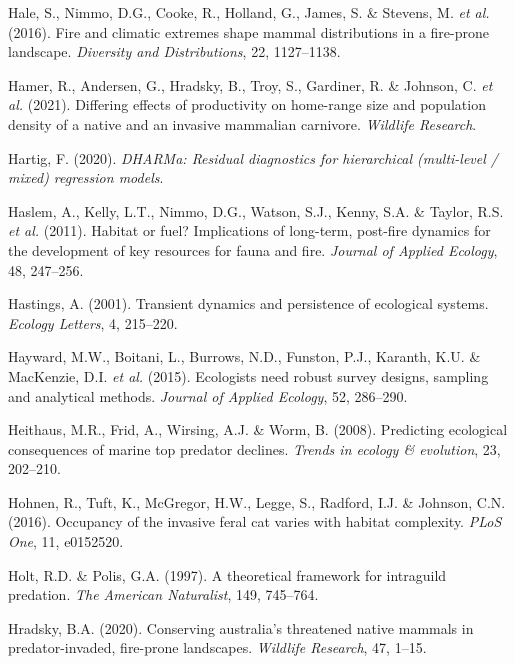 \documentclass[11pt,a4paper,titlepage,twoside,openright]{style/unimelbthesis}
\begin{document}
\begin{mainmatter}
\leavevmode\hypertarget{ref-hale2016fire}{}%
Hale, S., Nimmo, D.G., Cooke, R., Holland, G., James, S. \& Stevens, M. \emph{et al.} (2016). Fire and climatic extremes shape mammal distributions in a fire-prone landscape. \emph{Diversity and Distributions}, 22, 1127--1138.

\leavevmode\hypertarget{ref-hamerdiffering}{}%
Hamer, R., Andersen, G., Hradsky, B., Troy, S., Gardiner, R. \& Johnson, C. \emph{et al.} (2021). Differing effects of productivity on home-range size and population density of a native and an invasive mammalian carnivore. \emph{Wildlife Research}.

\leavevmode\hypertarget{ref-DHARMa}{}%
Hartig, F. (2020). \emph{DHARMa: Residual diagnostics for hierarchical (multi-level / mixed) regression models}.

\leavevmode\hypertarget{ref-haslem2011habitat}{}%
Haslem, A., Kelly, L.T., Nimmo, D.G., Watson, S.J., Kenny, S.A. \& Taylor, R.S. \emph{et al.} (2011). Habitat or fuel? Implications of long-term, post-fire dynamics for the development of key resources for fauna and fire. \emph{Journal of Applied Ecology}, 48, 247--256.

\leavevmode\hypertarget{ref-hastings2001transient}{}%
Hastings, A. (2001). Transient dynamics and persistence of ecological systems. \emph{Ecology Letters}, 4, 215--220.

\leavevmode\hypertarget{ref-hayward2015ecologists}{}%
Hayward, M.W., Boitani, L., Burrows, N.D., Funston, P.J., Karanth, K.U. \& MacKenzie, D.I. \emph{et al.} (2015). Ecologists need robust survey designs, sampling and analytical methods. \emph{Journal of Applied Ecology}, 52, 286--290.

\leavevmode\hypertarget{ref-heithaus2008predicting}{}%
Heithaus, M.R., Frid, A., Wirsing, A.J. \& Worm, B. (2008). Predicting ecological consequences of marine top predator declines. \emph{Trends in ecology \& evolution}, 23, 202--210.

\leavevmode\hypertarget{ref-hohnen2016occupancy}{}%
Hohnen, R., Tuft, K., McGregor, H.W., Legge, S., Radford, I.J. \& Johnson, C.N. (2016). Occupancy of the invasive feral cat varies with habitat complexity. \emph{PLoS One}, 11, e0152520.

\leavevmode\hypertarget{ref-holt1997theoretical}{}%
Holt, R.D. \& Polis, G.A. (1997). A theoretical framework for intraguild predation. \emph{The American Naturalist}, 149, 745--764.

\leavevmode\hypertarget{ref-hradsky2020conserving}{}%
Hradsky, B.A. (2020). Conserving australia's threatened native mammals in predator-invaded, fire-prone landscapes. \emph{Wildlife Research}, 47, 1--15.


\end{mainmatter}
\end{document}
